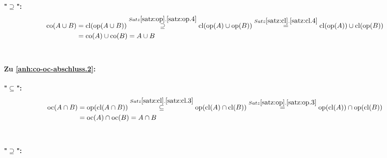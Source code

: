     \textbf{"$\boldsymbol{\supseteq}$":}
    \begin{align*}
        \text{co}(A \cup B) 
           &= \text{cl}(\text{op}(A \cup B)) 
           \overset{Satz \ref{satz:op}.\ref{satz:op.4}}{\supseteq} \text{cl}(\text{op}(A) \cup \text{op}(B))
           \overset{Satz \ref{satz:cl}.\ref{satz:cl.4}}{=} \text{cl}(\text{op}(A)) \cup \text{cl}(\text{op}(B))\\
           &= \text{co}(A) \cup \text{co}(B)
           = A \cup B
    \end{align*}
    \\ \ \\
    \noindent
    \textbf{Zu \ref{anh:co-oc-abschluss.2}:}
    \\ \ \\
    \textbf{"$\boldsymbol{\subseteq}$":}
    \begin{align*}
        \text{oc}(A \cap B) 
           &= \text{op}(\text{cl}(A \cap B)) 
           \overset{Satz \ref{satz:cl}.\ref{satz:cl.3}}{\subseteq} \text{op}(\text{cl}(A) \cap \text{cl}(B))
           \overset{Satz \ref{satz:op}.\ref{satz:op.3}}{=} \text{op}(\text{cl}(A)) \cap \text{op}(\text{cl}(B))\\
           &= \text{oc}(A) \cap \text{oc}(B)
           = A \cap B
    \end{align*}
    \\ \ \\
    \textbf{"$\boldsymbol{\supseteq}$":}
